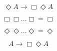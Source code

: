 \begin{equation} 
    \Diamond A \rightarrow \Box\Diamond A
\end{equation}
\label{diaaboxdiaa}

\begin{equation} 
    \Box\Box...\Box = \Box
\end{equation}
\label{alotbox}

\begin{equation} 
    \Diamond\Diamond...\Diamond = \Diamond
\end{equation}
\label{diamont}

\begin{equation} 
    A \rightarrow \Box\Diamond A
\end{equation}
\label{diamont}







